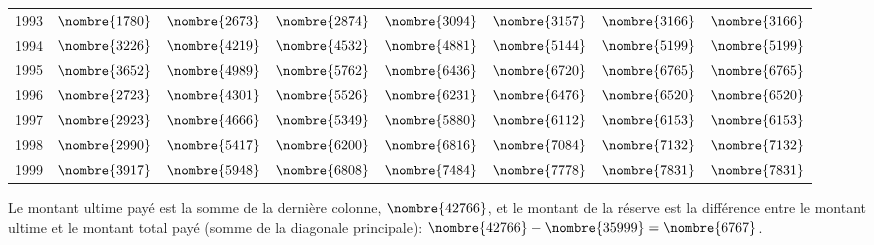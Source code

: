 \begin{exercice}
\begin{sol}
\begin{enumerate}
\begin{center}
\begin{tabular}{|l|l l l l l l l|}
          1993& $\nombre{1780}$& $\nombre{2673}$& $\nombre{2874}$& $\nombre{3094}$& $\nombre{3157}$& $\nombre{3166}$& $\nombre{3166}$ \\
          1994& $\nombre{3226}$& $\nombre{4219}$& $\nombre{4532}$& $\nombre{4881}$& $\nombre{5144}$& $\nombre{5199}$& $\nombre{5199}$ \\
          1995& $\nombre{3652}$& $\nombre{4989}$& $\nombre{5762}$& $\nombre{6436}$& $\nombre{6720}$& $\nombre{6765}$& $\nombre{6765}$ \\
          1996& $\nombre{2723}$& $\nombre{4301}$& $\nombre{5526}$& $\nombre{6231}$& $\nombre{6476}$& $\nombre{6520}$& $\nombre{6520}$ \\
          1997& $\nombre{2923}$& $\nombre{4666}$& $\nombre{5349}$& $\nombre{5880}$& $\nombre{6112}$& $\nombre{6153}$& $\nombre{6153}$ \\
          1998& $\nombre{2990}$& $\nombre{5417}$& $\nombre{6200}$& $\nombre{6816}$& $\nombre{7084}$& $\nombre{7132}$& $\nombre{7132}$ \\
          1999& $\nombre{3917}$& $\nombre{5948}$& $\nombre{6808}$& $\nombre{7484}$& $\nombre{7778}$& $\nombre{7831}$& $\nombre{7831}$\\\hline
        \end{tabular}
      \end{center}
      Le montant ultime payé est la somme de la dernière colonne,
      $\nombre{42766}$, et le montant de la réserve est la
      différence entre le montant ultime et le montant total payé
      (somme de la diagonale principale):
      $\nombre{42766} - \nombre{35999} = \nombre{6767}$.
    \end{enumerate}
  \end{sol}
\end{exercice}

